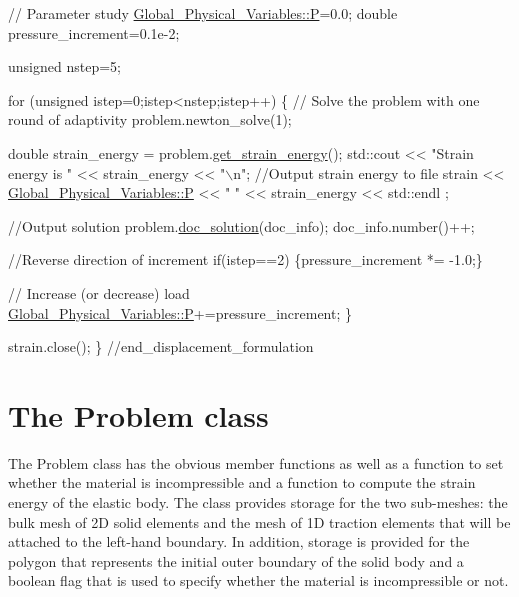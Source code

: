 \begin{DoxyCodeInclude}
  
  \textcolor{comment}{// Parameter study}
  \hyperlink{namespaceGlobal__Physical__Variables_a23c2ade6398f54040b869f7f3a2bcc4b}{Global\_Physical\_Variables::P}=0.0;
  \textcolor{keywordtype}{double} pressure\_increment=0.1e-2;
  
  \textcolor{keywordtype}{unsigned} nstep=5;

  \textcolor{keywordflow}{for} (\textcolor{keywordtype}{unsigned} istep=0;istep<nstep;istep++)
   \{
    \textcolor{comment}{// Solve the problem with one round of adaptivity}
    problem.newton\_solve(1);

    \textcolor{keywordtype}{double} strain\_energy = problem.\hyperlink{classUnstructuredSolidProblem_a4da918a1f0cf94ebccc5112b58c28ece}{get\_strain\_energy}();
    std::cout << \textcolor{stringliteral}{"Strain energy is "} << strain\_energy << \textcolor{stringliteral}{"\(\backslash\)n"};
    \textcolor{comment}{//Output strain energy to file}
    strain << \hyperlink{namespaceGlobal__Physical__Variables_a23c2ade6398f54040b869f7f3a2bcc4b}{Global\_Physical\_Variables::P} << \textcolor{stringliteral}{" "} << strain\_energy << std::endl
      ;

    \textcolor{comment}{//Output solution}
    problem.\hyperlink{classUnstructuredSolidProblem_ab3d66fd61b69d12b4f159d763fc44f15}{doc\_solution}(doc\_info);
    doc\_info.number()++;
    
    \textcolor{comment}{//Reverse direction of increment }
    \textcolor{keywordflow}{if}(istep==2) \{pressure\_increment *= -1.0;\}

    \textcolor{comment}{// Increase (or decrease) load}
    \hyperlink{namespaceGlobal__Physical__Variables_a23c2ade6398f54040b869f7f3a2bcc4b}{Global\_Physical\_Variables::P}+=pressure\_increment;
   \}

  strain.close();
 \} \textcolor{comment}{//end\_displacement\_formulation}

\end{DoxyCodeInclude}




 

\hypertarget{index_class}{}\section{The Problem class}\label{index_class}
The {\ttfamily Problem} class has the obvious member functions as well as a function to set whether the material is incompressible and a function to compute the strain energy of the elastic body. The class provides storage for the two sub-\/meshes\+: the bulk mesh of 2D solid elements and the mesh of 1D traction elements that will be attached to the left-\/hand boundary. In addition, storage is provided for the polygon that represents the initial outer boundary of the solid body and a boolean flag that is used to specify whether the material is incompressible or not.

